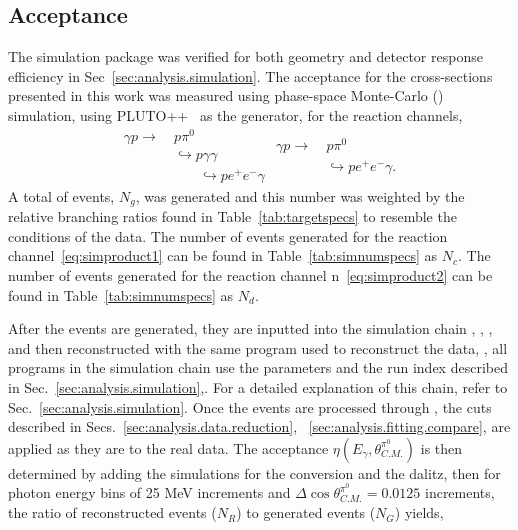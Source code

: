 \subsection{Acceptance}\label{sec:results.acceptance}

The simulation package was verified for both geometry and detector response efficiency in Sec~\ref{sec:analysis.simulation}. The acceptance for the cross-sections presented in this work was measured using phase-space Monte-Carlo (\label{abbr:mc}) simulation, using PLUTO++~\cite{PLUTO} as the generator, for the reaction channels,
\begin{subequations}
	\begin{align}
		\gamma p \rightarrow & \ p \pi^{0} \nonumber \\[-0.4em]
		& \ \hookrightarrow p \gamma \gamma \nonumber \\[-0.4em]
		& \qquad \hookrightarrow p e^+ e^- \gamma
		\label{eq:simproduct1}
		\end{align}
		\begin{align}
		\gamma p \rightarrow & \ p \pi^{0} \nonumber \\[-0.4em]
		& \ \hookrightarrow p e^+ e^- \gamma.
		\label{eq:simproduct2}
		\end{align}
\end{subequations} 
A total of events, $N_g$, was generated and this number was weighted by the relative branching ratios found in Table~\ref{tab:targetspecs} to resemble the conditions of the data. The number of events generated for the reaction channel~\ref{eq:simproduct1} can be found in Table~\ref{tab:simnumspecs} as $N_c$. The number of events generated for the reaction channel n~\ref{eq:simproduct2} can be found in Table~\ref{tab:simnumspecs} as $N_d$.

After the events are generated, they are inputted into the  simulation chain \label{abbr:gamp2bos}, \label{abbr:gsim}, \label{abbr:gpp}, and then reconstructed with the same program used to reconstruct the data, \label{abbr:a1c}, all programs in the simulation chain use the parameters and the run index described in Sec.~\ref{sec:analysis.simulation},. For a detailed explanation of this chain, refer to Sec.~\ref{sec:analysis.simulation}. Once the events are processed through , the cuts described in Secs.~\ref{sec:analysis.data.reduction}, ~\ref{sec:analysis.fitting.compare}, are applied as they are to the real data. The acceptance $\eta(E_\gamma,\theta^{\pi^0}_{C.M.})$ is then determined by adding the simulations for the conversion and the dalitz, then for photon energy bins of 25 MeV increments and $\Delta\cos\theta^{\pi^0}_{C.M.} = 0.0125$ increments, the ratio of reconstructed events ($N_R$) to generated events ($N_G$) yields,
